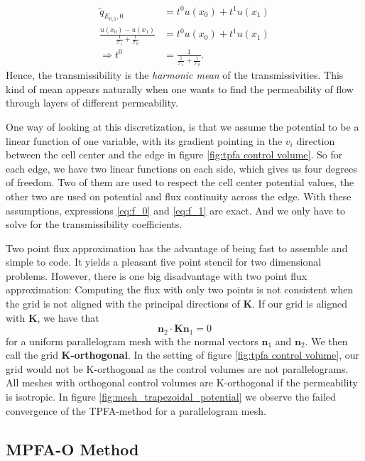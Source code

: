 \documentclass[../Main/main.tex]{subfiles}
\begin{document}
	\begin{equation}\label{eq:harmonic mean}
		\begin{aligned}
			\tilde{q}_{E_{0,1},0} &= t^0 u(x_0) + t^1 u(x_1) \\
			\frac{u(x_0)-u(x_1)}{\frac{1}{\mathcal{T}_1} + \frac{1}{\mathcal{T}_0}} &= t^0 u(x_0) + t^1 u(x_1) \\
			\Rightarrow t^0 &= \frac{1}{\frac{1}{\mathcal{T}_1} + \frac{1}{\mathcal{T}_0}}.
		\end{aligned}
	\end{equation} 
	Hence, the transmissibility is the \emph{harmonic mean} of the transmissivities. This kind of mean appears naturally when one wants to find the permeability of flow through layers of different permeability.
	\par
	  One way of looking at this discretization, is that we assume the potential to be a linear function of one variable, with its gradient pointing in the $v_i$ direction between the cell center and the edge in figure \ref{fig:tpfa control volume}. So for each edge, we have two linear functions on each side, which gives us four degrees of freedom. Two of them are used to respect the cell center potential values, the other two are used on potential and flux continuity across the edge. With these assumptions, expressions \eqref{eq:f_0} and \eqref{eq:f_1} are exact. And we only have to solve for the transmissibility coefficients.\par
	 Two point flux approximation has the advantage of being fast to assemble and simple to code. It yields a pleasant five point stencil for two dimensional problems. However, there is one big disadvantage with two point flux approximation: Computing the flux with only two points is not consistent when the grid is not aligned with the principal directions of $\bm{K}$. If our grid is aligned with $\bm{K}$, we have that 
	\begin{equation}
		\bm{n}_2 \cdot \bm{K}\bm{n}_1 = 0
	\end{equation}
	for a uniform parallelogram mesh with the normal vectors $\bm{n}_1$ and $\bm{n}_2$. We then call the grid \textbf{K-orthogonal}. 
	 In the setting of figure \ref{fig:tpfa control volume}, our grid would not be K-orthogonal as the control volumes are not parallelograms. All meshes with orthogonal control volumes are K-orthogonal if the permeability is isotropic. In figure \ref{fig:mesh_trapezoidal_potential} we observe the failed convergence of the TPFA-method for a parallelogram mesh.
	\subsection{MPFA-O Method}
\end{document}
